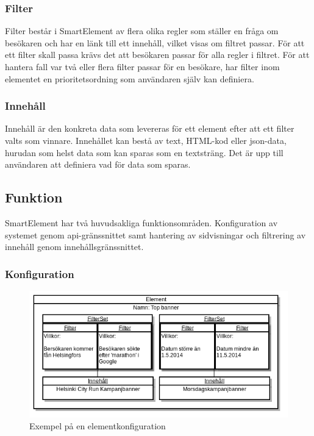 \subsubsection{Filter}

Filter består i SmartElement av flera olika regler som ställer en fråga om besökaren och har en länk till ett innehåll, vilket visas om filtret passar. För att ett filter skall passa krävs det att besökaren passar för alla regler i filtret. För att hantera fall var två eller flera filter passar för en besökare, har filter inom elementet en prioritetsordning som användaren själv kan definiera.

\subsubsection{Innehåll}

Innehåll är den konkreta data som levereras för ett element efter att ett filter valts som vinnare. Innehållet kan bestå av text, HTML-kod eller \gls{json}-data, hurudan som helst data som kan sparas som en textsträng. Det är upp till användaren att definiera vad för data som sparas.

\subsection{Funktion}

SmartElement har två huvudsakliga funktionsområden. Konfiguration av systemet genom \acrshort{api}-gränssnittet samt hantering av sidvisningar och filtrering av innehåll genom innehållsgränssnittet.

\subsubsection{Konfiguration}

\begin{figure}[h!]
\centering
\includegraphics[width=150mm]{assets/images/smelementelement.png}
\caption{Exempel på en elementkonfiguration}
\label{smelementelement}
\end{figure}

